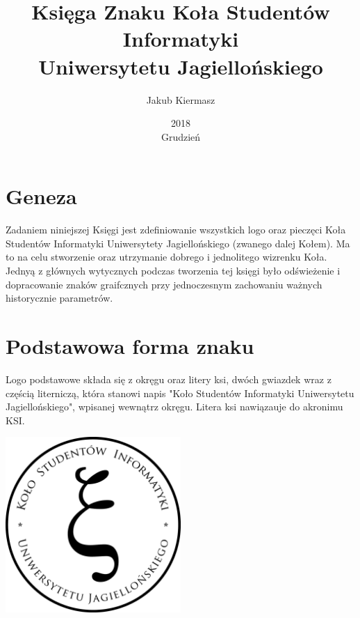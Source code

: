 \documentclass[titlepage]{mwart}
\title{Księga Znaku Koła Studentów Informatyki\\ Uniwersytetu Jagiellońskiego}
\date{2018\\ Grudzień}
\author{Jakub Kiermasz}
\newcommand{\lexsection}[1]{\section{#1}}
\begin{document}
\maketitle

\lexsection{Geneza}
Zadaniem niniejszej Księgi jest zdefiniowanie wszystkich logo oraz pieczęci Koła Studentów Informatyki Uniwersytety Jagiellońskiego (zwanego dalej Kołem). Ma to na celu stworzenie oraz utrzymanie dobrego i jednolitego wizrenku Koła.
\\
\newline
Jednyą z głównych wytycznych podczas tworzenia tej księgi było odświeżenie i dopracowanie znaków graifcznych przy jednoczesnym zachowaniu ważnych historycznie parametrów.

\lexsection{Podstawowa forma znaku}
Logo podstawowe składa się z okręgu oraz litery ksi, dwóch gwiazdek wraz z częścią literniczą, która stanowi napis "Koło Studentów Informatyki Uniwersytetu Jagiellońskiego", wpisanej wewnątrz okręgu. Litera ksi nawiązauje do akronimu KSI. 

\vspace{2\baselineskip}
\begin{center}
   \includegraphics[width=0.5\textwidth]{logo-ksi-basic.png} 
\end{center}
\end{document}
